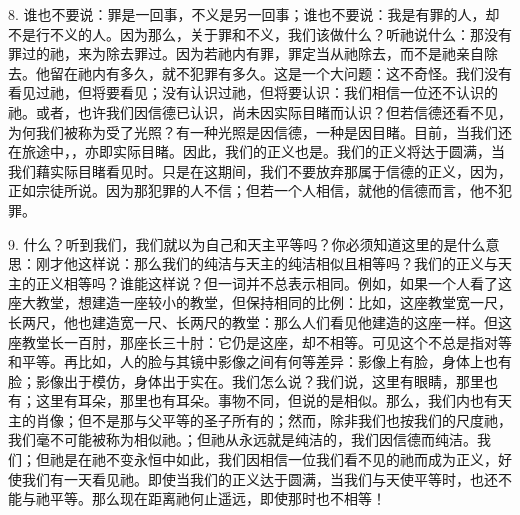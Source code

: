 8. 谁也不要说：罪是一回事，不义是另一回事；谁也不要说：我是有罪的人，却不是行不义的人。因为那么，关于罪和不义，我们该做什么？听祂说什么：那没有罪过的祂，来为除去罪过。因为若祂内有罪，罪定当从祂除去，而不是祂亲自除去。他留在祂内有多久，就不犯罪有多久。这是一个大问题：这不奇怪。我们没有看见过祂，但将要看见；没有认识过祂，但将要认识：我们相信一位还不认识的祂。或者，也许我们因信德已认识，尚未因实际目睹而认识？但若信德还看不见，为何我们被称为受了光照？有一种光照是因信德，一种是因目睹。目前，当我们还在旅途中，，亦即实际目睹。因此，我们的正义也是。我们的正义将达于圆满，当我们藉实际目睹看见时。只是在这期间，我们不要放弃那属于信德的正义，因为，正如宗徒所说。因为那犯罪的人不信；但若一个人相信，就他的信德而言，他不犯罪。\par

9. 什么？听到我们，我们就以为自己和天主平等吗？你必须知道这里的是什么意思：刚才他这样说：那么我们的纯洁与天主的纯洁相似且相等吗？我们的正义与天主的正义相等吗？谁能这样说？但一词并不总表示相同。例如，如果一个人看了这座大教堂，想建造一座较小的教堂，但保持相同的比例：比如，这座教堂宽一尺，长两尺，他也建造宽一尺、长两尺的教堂：那么人们看见他建造的这座一样。但这座教堂长一百肘，那座长三十肘：它仍是这座，却不相等。可见这个不总是指对等和平等。再比如，人的脸与其镜中影像之间有何等差异：影像上有脸，身体上也有脸；影像出于模仿，身体出于实在。我们怎么说？我们说，这里有眼睛，那里也有；这里有耳朵，那里也有耳朵。事物不同，但说的是相似。那么，我们内也有天主的肖像；但不是那与父平等的圣子所有的；然而，除非我们也按我们的尺度祂，我们毫不可能被称为相似祂。；但祂从永远就是纯洁的，我们因信德而纯洁。我们；但祂是在祂不变永恒中如此，我们因相信一位我们看不见的祂而成为正义，好使我们有一天看见祂。即使当我们的正义达于圆满，当我们与天使平等时，也还不能与祂平等。那么现在距离祂何止遥远，即使那时也不相等！\par

